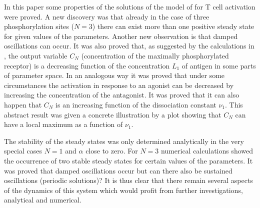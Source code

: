 \documentclass{article}
\begin{document}
In this paper some properties of the solutions of the model of \cite{francois13}
for T cell activation were proved. A new discovery was that already in the 
case of three phosphorylation sites ($N=3$) there can exist more than one 
positive steady state for given values of the parameters. Another new 
observation is that damped oscillations can occur. It was also proved 
that, as suggested by the calculations in \cite{francois13}, the output 
variable $C_N$ (concentration of the maximally phosphorylated receptor) is
a decreasing function of the concentration $L_1$ of antigen in some 
parts of parameter space. In an analogous way it was proved that under
some circumstances the activation in response to an agonist can be decreased
by increasing the concentration of the antagonist. It was proved that it can
also happen that $C_N$ is an increasing function of the dissociation
constant $\nu_1$. This abstract result was given a concrete illustration
by a plot showing that $C_N$ can have a local maximum as a function of $\nu_1$. 

The stability of the steady 
states was only determined analytically in the very special cases $N=1$ and 
$\alpha$ close to zero. For $N=3$ numerical calculations showed the 
occurrence of two stable steady states for certain values of the parameters.
It was proved that damped oscillations occur but can there
also be sustained oscillations (periodic solutions)? It is thus clear
that there remain several aspects of the dynamics of this system which would 
profit from further investigations, analytical and numerical.
\end{document}
